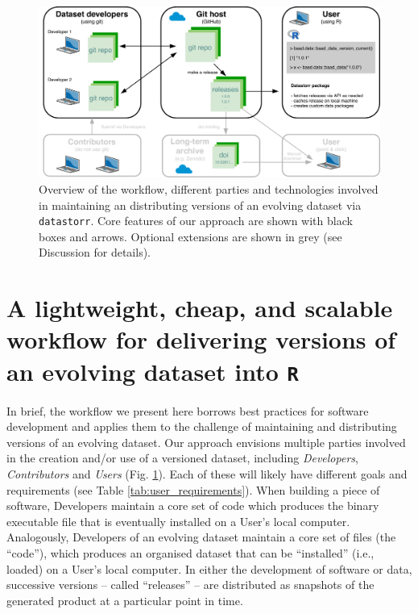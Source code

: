 \documentclass[a4paper,num-refs]{assets/oup-contemporary}
\begin{document}
\begin{figure}[!hb]
\centering
\includegraphics[width=\linewidth]{figures/Figure-stack.pdf}
\caption{Overview of the workflow, different parties and technologies involved in maintaining an distributing versions of an evolving dataset via \texttt{datastorr}.  Core features of our approach are shown with black boxes and arrows. Optional extensions are shown in grey (see Discussion for details).}
\label{fig:technology_stack}
\end{figure}

\section{A lightweight, cheap, and scalable workflow for delivering versions of an evolving dataset into \texttt{R}}

In brief, the workflow we present here borrows best practices for software development \cite{Perez-Riverol-2016} and applies them to the challenge of maintaining and distributing versions of an evolving dataset. Our approach envisions multiple parties involved in the creation and/or use of a versioned dataset, including \emph{Developers}, \emph{Contributors} and \emph{Users} (Fig. \ref{fig:technology_stack}). Each of these will likely have different goals and requirements (see Table \ref{tab:user_requirements}). When building a piece of software, Developers maintain a core set of code which produces the binary executable file that is eventually installed on a User's local computer. Analogously, Developers of an evolving dataset maintain a core set of files (the ``code''), which produces an organised dataset that can be ``installed'' (i.e., loaded) on a User's local computer. In either the development of software or data, successive versions -- called ``releases'' -- are distributed as snapshots of the generated product at a particular point in time. 
\end{document}
